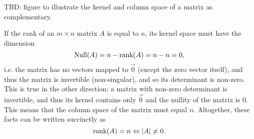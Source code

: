 TBD: figure to illustrate the kernel and column space of a matrix as complementary.

If the rank of an $m\times n$ matrix $A$ is equal to $n$, its kernel space must have the dimension
\begin{equation}
	\text{Null}(A) = n-\text{rank}(A) = n-n = 0,
	\label{eq:nullity_rank}
\end{equation}
i.e. the matrix has no vectors mapped to $\vec{0}$ (except the zero vector itself), and thus the matrix is invertible (non-singular), and so its determinant is non-zero. This is true in the other direction: a matrix with non-zero determinant is invertible, and thus its kernel contains only $\vec{0}$ and the nullity of the matrix is $0$. This means that the column space of the matrix must equal $n$. Altogether, these facts can be written succinctly as
\begin{equation}
	\text{rank}(A) = n \Leftrightarrow |A|\neq0.
	\label{eq:rank_det}
\end{equation}

